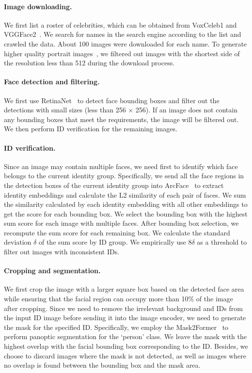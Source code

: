 \paragraph{Image downloading.}  
We first list a roster of celebrities, which can be obtained from VoxCeleb1 and VGGFace2~\cite{cao2018vggface2}. 
We search for names in the search engine according to the list and crawled the data. 
About 100 images were downloaded for each name. 
To generate higher quality portrait images~\cite{podell2023sdxl}, we filtered out images with the shortest side of the resolution less than 512 during the download process.

\paragraph{Face detection and filtering.} 
We first use RetinaNet~\cite{deng2020retinaface} to detect face bounding boxes and filter out the detections with small sizes (less than 256 × 256). 
If an image does not contain any bounding boxes that meet the requirements, the image will be filtered out.
We then perform ID verification for the remaining images.

\paragraph{ID verification.} 
Since an image may contain multiple faces, we need first to identify which face belongs to the current identity group.
Specifically, we send all the face regions in the detection boxes of the current identity group into ArcFace~\cite{deng2019arcface} to extract identity embeddings and calculate the L2 similarity of each pair of faces.
We sum the similarity calculated by each identity embedding with all other embeddings to get the score for each bounding box. 
We select the bounding box with the highest sum score for each image with multiple faces.
After bounding box selection, we recompute the sum score for each remaining box. 
We calculate the standard deviation $\delta$ of the sum score by ID group. 
We empirically use $8\delta$ as a threshold to filter out images with inconsistent IDs.

\paragraph{Cropping and segmentation.}
We first crop the image with a larger square box based on the detected face area while ensuring that the facial region can occupy more than 10\% of the image after cropping.
Since we need to remove the irrelevant background and IDs from the input ID image before sending it into the image encoder, we need to generate the mask for the specified ID.
Specifically, we employ the Mask2Former~\cite{cheng2021mask2former} to perform panoptic segmentation for the `person' class.
We leave the mask with the highest overlap with the facial bounding box corresponding to the ID.
Besides, we choose to discard images where the mask is not detected, as well as images where no overlap is found between the bounding box and the mask area.

